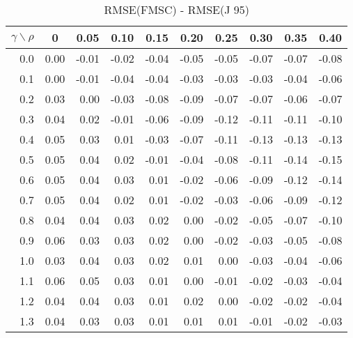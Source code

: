 \documentclass[12pt]{article}
\begin{document}
%
\begin{table}[!tbp]
\caption{RMSE(FMSC) - RMSE(J 95)}
 \begin{center}
 \begin{tabular}{r|rrrrrrrrr}\hline\hline
\multicolumn{1}{c|}{$\gamma\backslash\rho$}&\multicolumn{1}{c}{0}&\multicolumn{1}{c}{0.05}&\multicolumn{1}{c}{0.10}&\multicolumn{1}{c}{0.15}&\multicolumn{1}{c}{0.20}&\multicolumn{1}{c}{0.25}&\multicolumn{1}{c}{0.30}&\multicolumn{1}{c}{0.35}&\multicolumn{1}{c}{0.40}\tabularnewline
\hline
0.0&0.00&-0.01&-0.02&-0.04&-0.05&-0.05&-0.07&-0.07&-0.08\tabularnewline
0.1&0.00&-0.01&-0.04&-0.04&-0.03&-0.03&-0.03&-0.04&-0.06\tabularnewline
0.2&0.03& 0.00&-0.03&-0.08&-0.09&-0.07&-0.07&-0.06&-0.07\tabularnewline
0.3&0.04& 0.02&-0.01&-0.06&-0.09&-0.12&-0.11&-0.11&-0.10\tabularnewline
0.4&0.05& 0.03& 0.01&-0.03&-0.07&-0.11&-0.13&-0.13&-0.13\tabularnewline
0.5&0.05& 0.04& 0.02&-0.01&-0.04&-0.08&-0.11&-0.14&-0.15\tabularnewline
0.6&0.05& 0.04& 0.03& 0.01&-0.02&-0.06&-0.09&-0.12&-0.14\tabularnewline
0.7&0.05& 0.04& 0.02& 0.01&-0.02&-0.03&-0.06&-0.09&-0.12\tabularnewline
0.8&0.04& 0.04& 0.03& 0.02& 0.00&-0.02&-0.05&-0.07&-0.10\tabularnewline
0.9&0.06& 0.03& 0.03& 0.02& 0.00&-0.02&-0.03&-0.05&-0.08\tabularnewline
1.0&0.03& 0.04& 0.03& 0.02& 0.01& 0.00&-0.03&-0.04&-0.06\tabularnewline
1.1&0.06& 0.05& 0.03& 0.01& 0.00&-0.01&-0.02&-0.03&-0.04\tabularnewline
1.2&0.04& 0.04& 0.03& 0.01& 0.02& 0.00&-0.02&-0.02&-0.04\tabularnewline
1.3&0.04& 0.03& 0.03& 0.01& 0.01& 0.01&-0.01&-0.02&-0.03\tabularnewline
\hline
\end{tabular}

\end{center}

\end{table}
\end{document}
